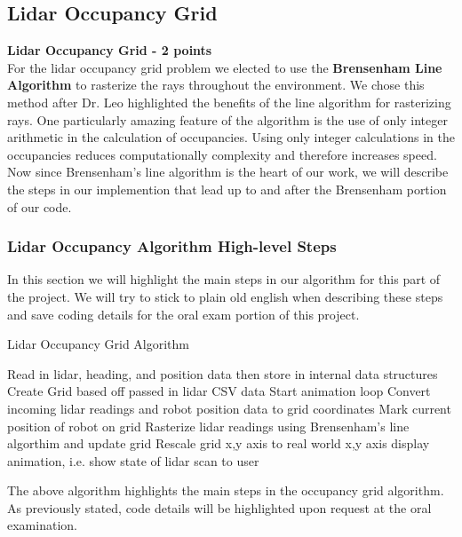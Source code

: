 \documentclass{article}
\numberwithin{equation}{section} %
\numberwithin{figure}{section} %
\numberwithin{table}{section} %
\begin{document}
\begin{framed}
\subsection{Lidar Occupancy Grid}
\label{sec:Perception}

\textbf{ Lidar Occupancy Grid - 2 points} \\

For the lidar occupancy grid problem we elected to use the \textbf{Brensenham Line Algorithm} to rasterize the rays throughout the environment.  We chose this method after Dr. Leo highlighted the benefits of the line algorithm for rasterizing rays.  One particularly amazing feature of the algorithm is the use of only integer arithmetic in the calculation of occupancies.  Using only integer calculations in the occupancies reduces computationally complexity and therefore increases speed. Now since Brensenham's line algorithm is the heart of our work, we will describe the steps in our implemention that lead up to and after the Brensenham portion of our code.

\subsubsection{Lidar Occupancy Algorithm High-level Steps}
In this section we will highlight the main steps in our algorithm for this part of the project. We will try to stick to plain old english when describing these steps and save coding details for the oral exam portion of this project.

 
\begin{algorithm}[H]
\caption{Lidar Occupancy Grid Algorithm}\label{alg:cap}
\begin{algorithmic}[1] %
\State Read in lidar, heading, and position data then store in internal data structures
\State Create Grid based off passed in lidar CSV data 
\State Start animation loop
\State Convert incoming lidar readings and robot position data to grid coordinates
\State Mark current position of robot on grid 
\State Rasterize lidar readings using Brensenham's line algorthim and update grid
\State Rescale grid x,y axis to real world x,y axis
\State display animation, i.e. show state of lidar scan to user
\EndWhile
\end{algorithmic}
\end{algorithm}

The above algorithm highlights the main steps in the occupancy grid algorithm.  As previously stated, code details will be highlighted upon request at the oral examination.


\end{framed}
\end{document}
